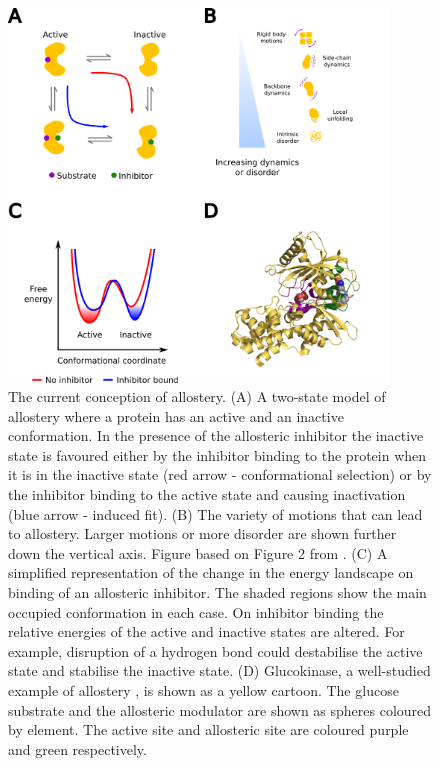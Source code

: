 \begin{figure}
\centering

\includegraphics[width=0.9\textwidth]{figures/allostery/allostery}

\caption{The current conception of allostery.
(A) A two-state model of allostery where a protein has an active and an inactive conformation.
In the presence of the allosteric inhibitor the inactive state is favoured either by the inhibitor binding to the protein when it is in the inactive state (red arrow - conformational selection) or by the inhibitor binding to the active state and causing inactivation (blue arrow - induced fit).
(B) The variety of motions that can lead to allostery.
Larger motions or more disorder are shown further down the vertical axis.
Figure based on Figure 2 from \cite{Motlagh2014}.
(C) A simplified representation of the change in the energy landscape on binding of an allosteric inhibitor.
The shaded regions show the main occupied conformation in each case.
On inhibitor binding the relative energies of the active and inactive states are altered.
For example, disruption of a hydrogen bond could destabilise the active state and stabilise the inactive state.
(D) Glucokinase, a well-studied example of allostery \cite{Kamata2004}, is shown as a yellow cartoon.
The glucose substrate and the allosteric modulator are shown as spheres coloured by element.
The active site and allosteric site are coloured purple and green respectively.}

\label{fig:allostery}
\end{figure}


